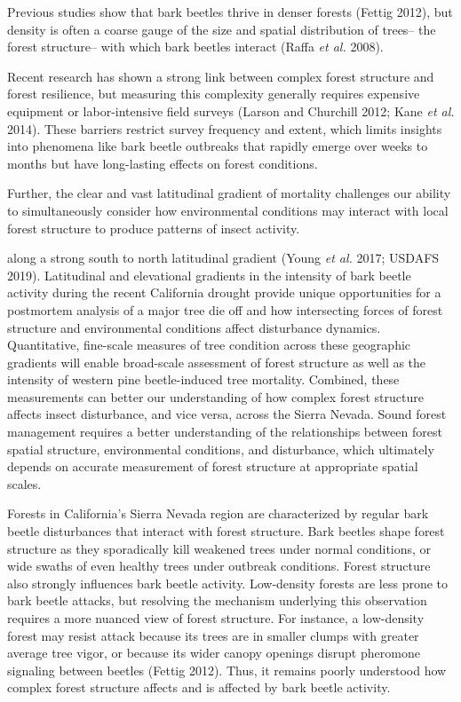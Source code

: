 \documentclass[]{article}
\begin{document}
Previous studies show that bark beetles thrive in denser forests (Fettig
2012), but density is often a coarse gauge of the size and spatial
distribution of trees-- the forest structure-- with which bark beetles
interact (Raffa \emph{et al.} 2008).

Recent research has shown a strong link between complex forest structure
and forest resilience, but measuring this complexity generally requires
expensive equipment or labor-intensive field surveys (Larson and
Churchill 2012; Kane \emph{et al.} 2014). These barriers restrict survey
frequency and extent, which limits insights into phenomena like bark
beetle outbreaks that rapidly emerge over weeks to months but have
long-lasting effects on forest conditions.

Further, the clear and vast latitudinal gradient of mortality challenges
our ability to simultaneously consider how environmental conditions may
interact with local forest structure to produce patterns of insect
activity.

along a strong south to north latitudinal gradient (Young \emph{et al.}
2017; USDAFS 2019). Latitudinal and elevational gradients in the
intensity of bark beetle activity during the recent California drought
provide unique opportunities for a postmortem analysis of a major tree
die off and how intersecting forces of forest structure and
environmental conditions affect disturbance dynamics. Quantitative,
fine-scale measures of tree condition across these geographic gradients
will enable broad-scale assessment of forest structure as well as the
intensity of western pine beetle-induced tree mortality. Combined, these
measurements can better our understanding of how complex forest
structure affects insect disturbance, and vice versa, across the Sierra
Nevada. Sound forest management requires a better understanding of the
relationships between forest spatial structure, environmental
conditions, and disturbance, which ultimately depends on accurate
measurement of forest structure at appropriate spatial scales.

Forests in California's Sierra Nevada region are characterized by
regular bark beetle disturbances that interact with forest structure.
Bark beetles shape forest structure as they sporadically kill weakened
trees under normal conditions, or wide swaths of even healthy trees
under outbreak conditions. Forest structure also strongly influences
bark beetle activity. Low-density forests are less prone to bark beetle
attacks, but resolving the mechanism underlying this observation
requires a more nuanced view of forest structure. For instance, a
low-density forest may resist attack because its trees are in smaller
clumps with greater average tree vigor, or because its wider canopy
openings disrupt pheromone signaling between beetles (Fettig 2012).
Thus, it remains poorly understood how complex forest structure affects
and is affected by bark beetle activity.
\end{document}
